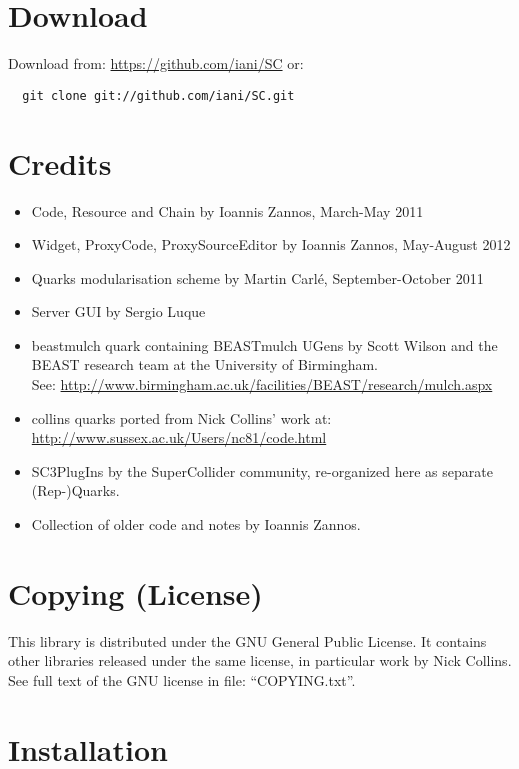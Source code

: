 \documentclass[11pt, a4paper]{scrartcl}
\begin{document}
\section*{Download}
\label{sec-2}


Download from: \href{https://github.com/iani/SC}{https://github.com/iani/SC}
or:
\begin{verbatim}
  git clone git://github.com/iani/SC.git
\end{verbatim}
\section*{Credits}
\label{sec-3}

\begin{itemize}
\item Code, Resource and Chain by Ioannis Zannos, March-May 2011
\item Widget, ProxyCode, ProxySourceEditor by Ioannis Zannos, May-August 2012
\item Quarks modularisation scheme by Martin Carl\'e, September-October 2011
\item Server GUI by Sergio Luque
\item beastmulch quark containing BEASTmulch UGens by Scott Wilson and the 
  BEAST research team at the University of Birmingham. \\ See: \href{http://www.birmingham.ac.uk/facilities/BEAST/research/mulch.aspx}{http://www.birmingham.ac.uk/facilities/BEAST/research/mulch.aspx}
\item collins quarks ported from Nick Collins' work at: \href{http://www.sussex.ac.uk/Users/nc81/code.html}{http://www.sussex.ac.uk/Users/nc81/code.html}
\item SC3PlugIns by the SuperCollider community, re-organized here as separate (Rep-)Quarks.
\item Collection of older code and notes by Ioannis Zannos.
\end{itemize}
\section*{Copying (License)}
\label{sec-4}


This library is distributed under the GNU General Public License. It contains other libraries released under the same license, in particular work by Nick Collins. See full text of the GNU license in file: ``COPYING.txt''.
\section*{Installation}
\label{sec-5}
\end{document}
